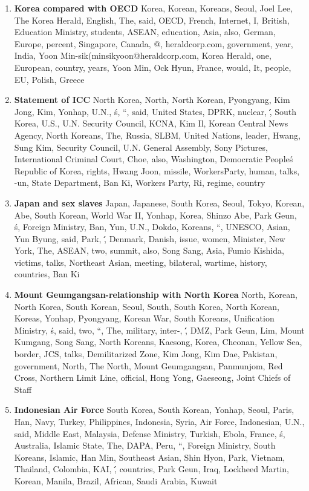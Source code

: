 \begin{enumerate}
  \item \textbf{Korea compared with OECD} Korea, Korean, Koreans, Seoul, Joel Lee, The Korea Herald, English, The, said, OECD, French, Internet, I, British, Education Ministry, students, ASEAN, education, Asia, also, German, Europe, percent, Singapore, Canada, @, heraldcorp.com, government, year, India, Yoon Min-sik(minsikyoon@heraldcorp.com, Korea Herald, one, European, country, years, Yoon Min, Ock Hyun, France, would, It, people, EU, Polish, Greece
  \item \textbf{Statement of ICC} North Korea, North, North Korean, Pyongyang, Kim Jong, Kim, Yonhap, U.N., \'s, ``, said, United States, DPRK, nuclear, \'\', South Korea, U.S., U.N. Security Council, KCNA, Kim Il, Korean Central News Agency, North Koreans, The, Russia, SLBM, United Nations, leader, Hwang, Sung Kim, Security Council, U.N. General Assembly, Sony Pictures, International Criminal Court, Choe, also, Washington, Democratic People\'s Republic of Korea, rights, Hwang Joon, missile, Workers\' Party, human, talks, -un, State Department, Ban Ki, Workers Party, Ri, regime, country
  \item \textbf{Japan and sex slaves} Japan, Japanese, South Korea, Seoul, Tokyo, Korean, Abe, South Korean, World War II, Yonhap, Korea, Shinzo Abe, Park Geun, \'s, Foreign Ministry, Ban, Yun, U.N., Dokdo, Koreans, ``, UNESCO, Asian, Yun Byung, said, Park, \'\', Denmark, Danish, issue, women, Minister, New York, The, ASEAN, two, summit, also, Song Sang, Asia, Fumio Kishida, victims, talks, Northeast Asian, meeting, bilateral, wartime, history, countries, Ban Ki
  \item \textbf{Mount Geumgangsan-relationship with North Korea} North, Korean, North Korea, South Korean, Seoul, South, South Korea, North Korean, Koreas, Yonhap, Pyongyang, Korean War, South Koreans, Unification Ministry, \'s, said, two, ``, The, military, inter-, \'\', DMZ, Park Geun, Lim, Mount Kumgang, Song Sang, North Koreans, Kaesong, Korea, Cheonan, Yellow Sea, border, JCS, talks, Demilitarized Zone, Kim Jong, Kim Dae, Pakistan, government, North, The North, Mount Geumgangsan, Panmunjom, Red Cross, Northern Limit Line, official, Hong Yong, Gaeseong, Joint Chiefs of Staff
  \item \textbf{Indonesian Air Force} South Korea, South Korean, Yonhap, Seoul, Paris, Han, Navy, Turkey, Philippines, Indonesia, Syria, Air Force, Indonesian, U.N., said, Middle East, Malaysia, Defense Ministry, Turkish, Ebola, France, \'s, Australia, Islamic State, The, DAPA, Peru, ``, Foreign Ministry, South Koreans, Islamic, Han Min, Southeast Asian, Shin Hyon, Park, Vietnam, Thailand, Colombia, KAI, \'\', countries, Park Geun, Iraq, Lockheed Martin, Korean, Manila, Brazil, African, Saudi Arabia, Kuwait

\end{enumerate}
